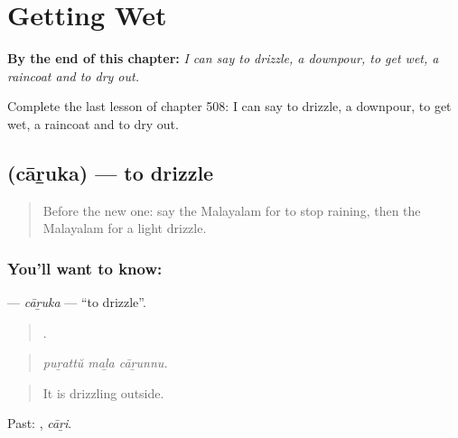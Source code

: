
\chapter{Getting Wet}
\label{ch:ml-getting-wet}

\begin{chapteropening}
\textbf{By the end of this chapter:} \emph{I can say to drizzle, a downpour, to get wet, a raincoat and to dry out.}

Complete the last lesson of chapter 508: I can say to drizzle, a downpour, to get wet, a raincoat and to dry out.
\end{chapteropening}

\section[\texorpdfstring{\ml{ചാറുക} (cāṟuka)}{ചാറുക (cāṟuka)}]{ (cāṟuka) — to drizzle}

\label{lesson:ML-C508-caruka-drizzle}



\begin{quote}
Before the new one: say the Malayalam for to stop raining, then the Malayalam for a light drizzle.
\end{quote}

\subsection*{You'll want to know: }
\textbf{} — \emph{cāṟuka} — \textquotedblleft{}to drizzle\textquotedblright{}.

\begin{quote}
  .
\end{quote}

\begin{quote}
\emph{puṟattŭ maḻa cāṟunnu.}
\end{quote}

\begin{quote}
It is drizzling outside.
\end{quote}

Past: , \emph{cāṟi}.

